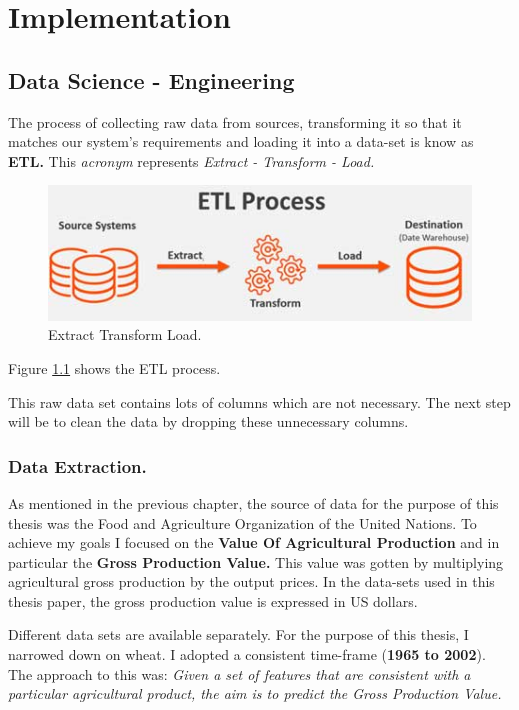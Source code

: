 \documentclass[
]{thesis-ekf}
\begin{document}
\chapter{Implementation}
\section{Data Science - Engineering}

The process of collecting raw data from sources, transforming it so that it matches our system's requirements and loading it into a data-set is know as \textbf{ETL.} This \textit{acronym} represents \textit{Extract - Transform - Load.}

\begin{figure}[h!]
	\includegraphics[width=\textwidth,height=\textheight,keepaspectratio]{fig/etl.jpg}
	\caption{Extract Transform Load.}
	\label{fig:ETL}
\end{figure}

Figure \ref{fig:ETL} shows the ETL process.


This raw data set contains lots of columns which are not necessary. The next step will be to clean the data by dropping these unnecessary columns. 


\subsection{Data Extraction.}

As mentioned in the previous chapter, the source of data for the purpose of this thesis was the Food and Agriculture Organization of the United Nations. To achieve my goals I focused on the \textbf{Value Of Agricultural Production} and in particular the \textbf{Gross Production Value.} This value was gotten by multiplying agricultural gross production by the output prices. In the data-sets used in this thesis paper, the gross production value is expressed in US dollars. 


Different data sets are available separately. For the purpose of this thesis, I narrowed down on wheat. I adopted a consistent time-frame (\textbf{1965 to 2002}). The approach to this was: \textit{Given a set of features that are consistent with a particular agricultural product, the aim is to predict the Gross Production Value.}
\end{document}
